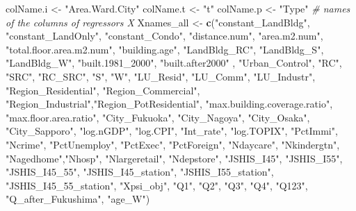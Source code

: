 \documentclass[
]{article}
\newenvironment{Shaded}{\begin{snugshade}}{\end{snugshade}}
\newcommand{\CommentTok}[1]{\textcolor[rgb]{0.56,0.35,0.01}{\textit{#1}}}
\newcommand{\KeywordTok}[1]{\textcolor[rgb]{0.13,0.29,0.53}{\textbf{#1}}}
\newcommand{\NormalTok}[1]{#1}
\newcommand{\StringTok}[1]{\textcolor[rgb]{0.31,0.60,0.02}{#1}}
\begin{document}
\begin{Shaded}
\begin{Highlighting}[]
\NormalTok{colName.i <-}\StringTok{ "Area.Ward.City"}
\NormalTok{colName.t <-}\StringTok{ "t"}
\NormalTok{colName.p <-}\StringTok{ "Type"}
\CommentTok{# names of the columns of regressors X }
\NormalTok{Xnames_all <-}\StringTok{ }\KeywordTok{c}\NormalTok{(}\StringTok{"constant_LandBldg"}\NormalTok{, }\StringTok{"constant_LandOnly"}\NormalTok{, }\StringTok{"constant_Condo"}\NormalTok{,}
                 \StringTok{"distance.num"}\NormalTok{, }\StringTok{"area.m2.num"}\NormalTok{, }\StringTok{"total.floor.area.m2.num"}\NormalTok{,}
                 \StringTok{"building.age"}\NormalTok{, }
                 \StringTok{"LandBldg_RC"}\NormalTok{, }\StringTok{"LandBldg_S"}\NormalTok{, }\StringTok{"LandBldg_W"}\NormalTok{,}
                 \StringTok{"built.1981_2000"}\NormalTok{, }\StringTok{"built.after2000"}\NormalTok{ ,}
                 \StringTok{"Urban_Control"}\NormalTok{, }
                \StringTok{"RC"}\NormalTok{, }\StringTok{"SRC"}\NormalTok{, }\StringTok{"RC_SRC"}\NormalTok{, }\StringTok{"S"}\NormalTok{, }\StringTok{"W"}\NormalTok{, }
                \StringTok{"LU_Resid"}\NormalTok{, }\StringTok{"LU_Comm"}\NormalTok{, }\StringTok{"LU_Industr"}\NormalTok{,}
                \StringTok{"Region_Residential"}\NormalTok{, }\StringTok{"Region_Commercial"}\NormalTok{, }
                \StringTok{"Region_Industrial"}\NormalTok{,}\StringTok{"Region_PotResidential"}\NormalTok{,}
                 \StringTok{"max.building.coverage.ratio"}\NormalTok{, }\StringTok{"max.floor.area.ratio"}\NormalTok{,}
                 \StringTok{"City_Fukuoka"}\NormalTok{, }\StringTok{"City_Nagoya"}\NormalTok{, }\StringTok{"City_Osaka"}\NormalTok{, }\StringTok{"City_Sapporo"}\NormalTok{,}
                 \StringTok{"log.nGDP"}\NormalTok{, }\StringTok{"log.CPI"}\NormalTok{,  }\StringTok{"Int_rate"}\NormalTok{, }\StringTok{"log.TOPIX"}\NormalTok{,}
                 \StringTok{"PctImmi"}\NormalTok{, }\StringTok{"Ncrime"}\NormalTok{, }\StringTok{"PctUnemploy"}\NormalTok{, }\StringTok{"PctExec"}\NormalTok{,}
                \StringTok{"PctForeign"}\NormalTok{, }\StringTok{"Ndaycare"}\NormalTok{, }\StringTok{"Nkindergtn"}\NormalTok{, }\StringTok{"Nagedhome"}\NormalTok{,}\StringTok{"Nhosp"}\NormalTok{, }
                 \StringTok{"Nlargeretail"}\NormalTok{, }\StringTok{"Ndepstore"}\NormalTok{,      }
                 \StringTok{"JSHIS_I45"}\NormalTok{, }\StringTok{"JSHIS_I55"}\NormalTok{, }\StringTok{"JSHIS_I45_55"}\NormalTok{,}
                \StringTok{"JSHIS_I45_station"}\NormalTok{, }\StringTok{"JSHIS_I55_station"}\NormalTok{,}
                \StringTok{"JSHIS_I45_55_station"}\NormalTok{,}
                \StringTok{"Xpsi_obj"}\NormalTok{,}
                \StringTok{"Q1"}\NormalTok{, }\StringTok{"Q2"}\NormalTok{, }\StringTok{"Q3"}\NormalTok{, }\StringTok{"Q4"}\NormalTok{, }\StringTok{"Q123"}\NormalTok{, }
                \StringTok{"Q_after_Fukushima"}\NormalTok{, }\StringTok{"age_W"}\NormalTok{)}


\end{Highlighting}
\end{Shaded}
\end{document}
